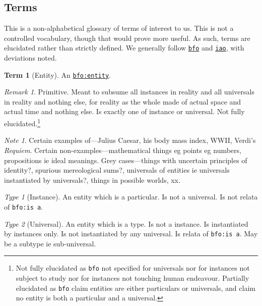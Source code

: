 \documentclass{amsart}%
\newcommand{\code}[1]{\texttt{#1}}%
\newcommand{\titleit}[1]{\textit{#1}}%
\theoremstyle{plain}
\theoremstyle{definition}
\theoremstyle{remark}
\newtheorem*{note}{Note}
\theoremstyle{definition}
\newtheorem{term}{Term}[subsection]%
\theoremstyle{remark}
\newtheorem*{term-type}{Type}
\newtheorem*{term-note}{Remark}
\begin{document}
\subsection{Terms}
\label{ss:terms}
This is a non-alphabetical glossary of terms of interest to us. This is not a controlled vocabulary, though that would prove more useful. As such, terms are elucidated rather than strictly defined. We generally follow \href{https://www.ebi.ac.uk/ols4/ontologies/bfo}{\code{bfo}} and \href{https://www.ebi.ac.uk/ols4/ontologies/iao}{\code{iao}}, with deviations noted.
%
%
%
\begin{term}[Entity]
\label{term:entity}
An \href{http://purl.obolibrary.org/obo/BFO_0000001}{\code{bfo:entity}}.
\begin{term-note}
Primitive. Meant to subsume all instances in reality %
and all universals in reality and nothing else, for reality as the whole made of actual space and actual time and nothing else. Is exactly one of instance or universal. Not fully elucidated.\footnote{Not fully elucidated as \code{bfo} not specified for universals nor for instances not subject to study nor for instances not touching human endeavour. %
Partially elucidated as \code{bfo} claim entities are either particulars or universals, and claim no entity is both a particular and a universal.}
\end{term-note}
\begin{note}
Certain examples of---Julius Caesar, his body mass index, WWII, Verdi's \titleit{Requiem}. Certain non-examples---mathematical things eg points eg numbers, propositions ie ideal meanings. Grey cases---things with uncertain principles of identity?, spurious mereological sums?, universals of entities ie universals instantiated by universals?, things in possible worlds, xx.%
\end{note}
\begin{term-type}[Instance]
An entity which is a particular. Is not a universal. Is not relata of \code{bfo:is a}.
\end{term-type}
\begin{term-type}[Universal]
An entity which is a type. Is not a instance. Is instantiated by instances only. Is not instantiated by any universal. Is relata of \code{bfo:is a}. May be a subtype ie sub-universal.%
\end{term-type}
\end{term}
\end{document}
